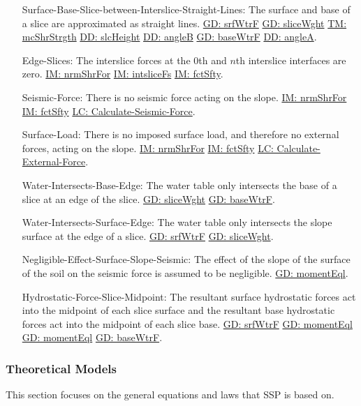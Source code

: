 \documentclass[12pt]{article}
\begin{document}
\begin{itemize}
\item[Surface-Base-Slice-between-Interslice-Straight-Lines:\phantomsection\label{assumpSBSBISL}]The surface and base of a slice are approximated as straight lines. \hyperref[GD:srfWtrF]{GD: srfWtrF} \hyperref[GD:sliceWght]{GD: sliceWght} \hyperref[TM:mcShrStrgth]{TM: mcShrStrgth} \hyperref[DD:slcHeight]{DD: slcHeight} \hyperref[DD:angleB]{DD: angleB} \hyperref[GD:baseWtrF]{GD: baseWtrF} \hyperref[DD:angleA]{DD: angleA}.
\item[Edge-Slices:\phantomsection\label{assumpES}]The interslice forces at the 0th and $n$th interslice interfaces are zero. \hyperref[IM:nrmShrFor]{IM: nrmShrFor} \hyperref[IM:intsliceFs]{IM: intsliceFs} \hyperref[IM:fctSfty]{IM: fctSfty}.
\item[Seismic-Force:\phantomsection\label{assumpSF}]There is no seismic force acting on the slope. \hyperref[IM:nrmShrFor]{IM: nrmShrFor} \hyperref[IM:fctSfty]{IM: fctSfty} \hyperref[LC_seismic]{LC: Calculate-Seismic-Force}.
\item[Surface-Load:\phantomsection\label{assumpSL}]There is no imposed surface load, and therefore no external forces, acting on the slope. \hyperref[IM:nrmShrFor]{IM: nrmShrFor} \hyperref[IM:fctSfty]{IM: fctSfty} \hyperref[LC_external]{LC: Calculate-External-Force}.
\item[Water-Intersects-Base-Edge:\phantomsection\label{assumpWIBE}]The water table only intersects the base of a slice at an edge of the slice. \hyperref[GD:sliceWght]{GD: sliceWght} \hyperref[GD:baseWtrF]{GD: baseWtrF}.
\item[Water-Intersects-Surface-Edge:\phantomsection\label{assumpWISE}]The water table only intersects the slope surface at the edge of a slice. \hyperref[GD:srfWtrF]{GD: srfWtrF} \hyperref[GD:sliceWght]{GD: sliceWght}.
\item[Negligible-Effect-Surface-Slope-Seismic:\phantomsection\label{assumpNESSS}]The effect of the slope of the surface of the soil on the seismic force is assumed to be negligible. \hyperref[GD:momentEql]{GD: momentEql}.
\item[Hydrostatic-Force-Slice-Midpoint:\phantomsection\label{assumpHFSM}]The resultant surface hydrostatic forces act into the midpoint of each slice surface and the resultant base hydrostatic forces act into the midpoint of each slice base. \hyperref[GD:srfWtrF]{GD: srfWtrF} \hyperref[GD:momentEql]{GD: momentEql} \hyperref[GD:momentEql]{GD: momentEql} \hyperref[GD:baseWtrF]{GD: baseWtrF}.
\end{itemize}
\subsubsection{Theoretical Models}
\label{Sec:TMs}
This section focuses on the general equations and laws that SSP is based on.
\par~
\end{document}
